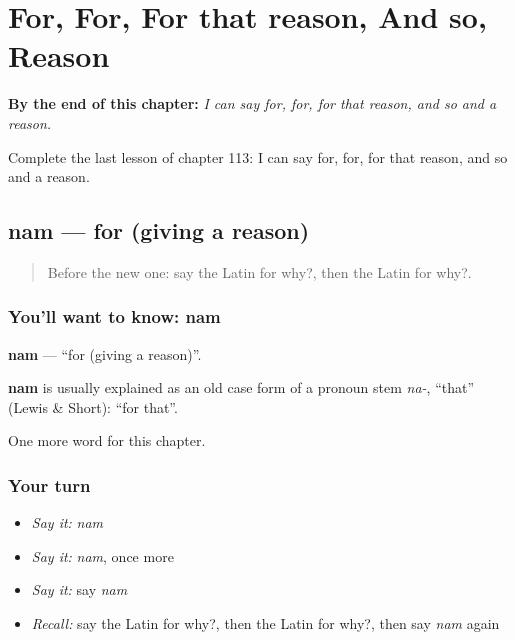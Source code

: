 
\chapter{For, For, For that reason, And so, Reason}
\label{ch:la-for-for-for-that-reason-and-so-reason}

\begin{chapteropening}
\textbf{By the end of this chapter:} \emph{I can say for, for, for that reason, and so and a reason.}

Complete the last lesson of chapter 113: I can say for, for, for that reason, and so and a reason.
\end{chapteropening}

\section[nam]{nam — for (giving a reason)}

\label{lesson:LA-C113-nam}



\begin{quote}
Before the new one: say the Latin for why?, then the Latin for why?.
\end{quote}

\subsection*{You'll want to know: nam}
\textbf{nam} — \textquotedblleft{}for (giving a reason)\textquotedblright{}.

\begin{cousinweb}
\textbf{nam} is usually explained as an old case form of a pronoun stem \emph{na-}, \textquotedblleft{}that\textquotedblright{} (Lewis \& Short): \textquotedblleft{}for that\textquotedblright{}.
\end{cousinweb}

\begin{grammarlens}[title={What you've built}]
One more word for this chapter.
\end{grammarlens}

\subsection*{Your turn}
\begin{itemize}
\raggedright
  \item \emph{Say it:} \emph{nam}
  \item \emph{Say it:} \emph{nam}, once more
  \item \emph{Say it:} say \emph{nam}
  \item \emph{Recall:} say the Latin for why?, then the Latin for why?, then say \emph{nam} again
\end{itemize}

